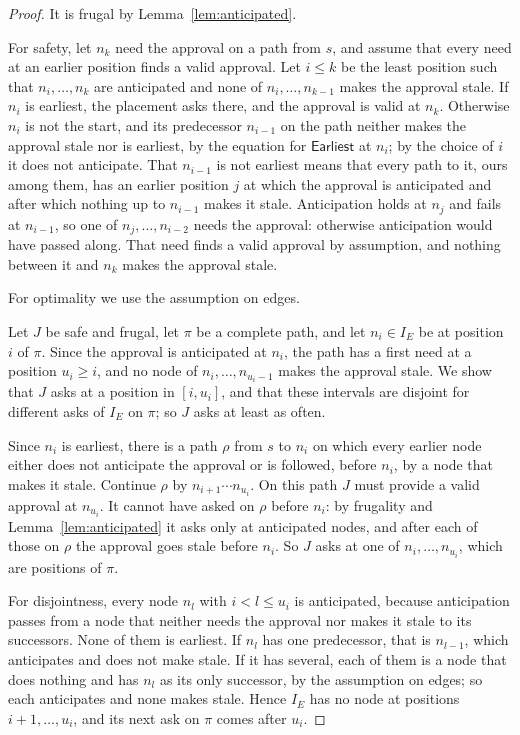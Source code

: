 \documentclass[acmsmall,nonacm,screen]{acmart}
\newcommand{\kw}[1]{\mathsf{#1}}
\newcommand{\Earliest}{\kw{Earliest}}
\begin{document}
\begin{proof}
It is frugal by Lemma~\ref{lem:anticipated}.

For safety, let $n_k$ need the approval on a path from $s$, and assume that every need at
an earlier position finds a valid approval. Let $i \le k$ be the least position such that
$n_i, \ldots, n_k$ are anticipated and none of $n_i, \ldots, n_{k-1}$ makes the approval
stale. If $n_i$ is earliest, the placement asks there, and the approval is valid at $n_k$.
Otherwise $n_i$ is not the start, and its predecessor $n_{i-1}$ on the path neither makes
the approval stale nor is earliest, by the equation for $\Earliest$ at $n_i$; by the choice
of $i$ it does not anticipate. That $n_{i-1}$ is not earliest means that every path to it,
ours among them, has an earlier position $j$ at which the approval is anticipated and after
which nothing up to $n_{i-1}$ makes it stale. Anticipation holds at $n_j$ and fails at
$n_{i-1}$, so one of $n_j, \ldots, n_{i-2}$ needs the approval: otherwise anticipation
would have passed along. That need finds a valid approval by assumption, and nothing
between it and $n_k$ makes the approval stale.

For optimality we use the assumption on edges.

Let $J$ be safe and frugal, let $\pi$ be a complete path, and let $n_i \in I_E$ be at
position $i$ of $\pi$. Since the approval is anticipated at $n_i$, the path has a first
need at a position $u_i \ge i$, and no node of $n_i, \ldots, n_{u_i - 1}$ makes the
approval stale. We show that $J$ asks at a position in $[i, u_i]$, and that these intervals
are disjoint for different asks of $I_E$ on $\pi$; so $J$ asks at least as often.

Since $n_i$ is earliest, there is a path $\rho$ from $s$ to $n_i$ on which every earlier
node either does not anticipate the approval or is followed, before $n_i$, by a node that
makes it stale. Continue $\rho$ by $n_{i+1} \cdots n_{u_i}$. On this path $J$ must provide a
valid approval at $n_{u_i}$. It cannot have asked on $\rho$ before $n_i$: by frugality and
Lemma~\ref{lem:anticipated} it asks only at anticipated nodes, and after each of those on
$\rho$ the approval goes stale before $n_i$. So $J$ asks at one of $n_i, \ldots, n_{u_i}$,
which are positions of $\pi$.

For disjointness, every node $n_l$ with $i < l \le u_i$ is anticipated, because
anticipation passes from a node that neither needs the approval nor makes it stale to its
successors. None of them is earliest. If $n_l$ has one predecessor, that is $n_{l-1}$,
which anticipates and does not make stale. If it has several, each of them is a node that
does nothing and has $n_l$ as its only successor, by the assumption on edges; so each
anticipates and none makes stale. Hence $I_E$ has no node at positions $i + 1, \ldots, u_i$,
and its next ask on $\pi$ comes after $u_i$.
\end{proof}
\end{document}
